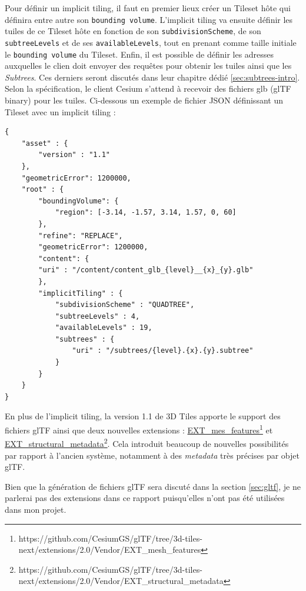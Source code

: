 Pour définir un implicit tiling, il faut en premier lieux créer un Tileset hôte qui définira entre autre son \texttt{bounding volume}. L'implicit tiling va ensuite définir les tuiles de ce Tileset hôte en fonction de son \texttt{subdivisionScheme}, de son \texttt{subtreeLevels} et de ses \texttt{availableLevels}, tout en prenant comme taille initiale le \texttt{bounding volume} du Tileset. Enfin, il est possible de définir les adresses auxquelles le clien doit envoyer des requêtes pour obtenir les tuiles ainsi que les \textit{Subtrees}. Ces derniers seront discutés dans leur chapitre dédié \autoref{sec:subtrees-intro}. Selon la spécification, le client Cesium s'attend à recevoir des fichiers glb (glTF binary) pour les tuiles. Ci-dessous un exemple de fichier JSON définissant un Tileset avec un implicit tiling :

\begin{verbatim}
{
    "asset" : {
        "version" : "1.1"
    },
    "geometricError": 1200000,
    "root" : {
        "boundingVolume": {
            "region": [-3.14, -1.57, 3.14, 1.57, 0, 60]
        },
        "refine": "REPLACE",
        "geometricError": 1200000,
        "content": {
        "uri" : "/content/content_glb_{level}__{x}_{y}.glb"
        },
        "implicitTiling" : {
            "subdivisionScheme" : "QUADTREE",
            "subtreeLevels" : 4,
            "availableLevels" : 19,
            "subtrees" : {
                "uri" : "/subtrees/{level}.{x}.{y}.subtree"
            }
        }
    }
}
\end{verbatim}

En plus de l'implicit tiling, la version 1.1 de 3D Tiles apporte le support des fichiers glTF ainsi que deux nouvelles extensions : \href{https://github.com/CesiumGS/glTF/tree/3d-tiles-next/extensions/2.0/Vendor/EXT_mesh_features}{EXT\_mes\_features}\footnote{https://github.com/CesiumGS/glTF/tree/3d-tiles-next/extensions/2.0/Vendor/EXT\_mesh\_features} et \href{https://github.com/CesiumGS/glTF/tree/3d-tiles-next/extensions/2.0/Vendor/EXT_structural_metadata}{EXT\_structural\_metadata}\footnote{https://github.com/CesiumGS/glTF/tree/3d-tiles-next/extensions/2.0/Vendor/EXT\_structural\_metadata}. Cela introduit beaucoup de nouvelles possibilités par rapport à l'ancien système, notamment à des \textit{metadata} très précises par objet glTF.

Bien que la génération de fichiers glTF sera discuté dans la section \ref{sec:gltf}, je ne parlerai pas des extensions dans ce rapport puisqu'elles n'ont pas été utilisées dans mon projet.

